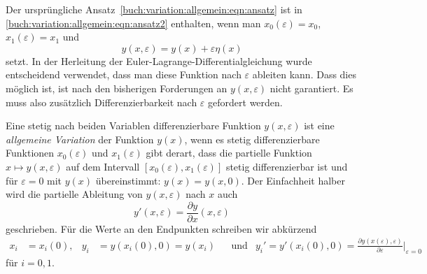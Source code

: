 Der ursprüngliche Ansatz~\eqref{buch:variation:allgemein:eqn:ansatz}
ist in \eqref{buch:variation:allgemein:eqn:ansatz2} enthalten, wenn
man $x_0(\varepsilon)=x_0$, $x_1(\varepsilon)=x_1$ und
\[
y(x,\varepsilon) = y(x) + \varepsilon \eta(x)
\]
setzt.
In der Herleitung der Euler-Lagrange-Differentialgleichung wurde
entscheidend verwendet, dass man diese Funktion nach $\varepsilon$
ableiten kann.
Dass dies möglich ist, ist nach den bisherigen Forderungen an
$y(x,\varepsilon)$ nicht garantiert.
Es muss also zusätzlich Differenzierbarkeit nach $\varepsilon$
gefordert werden.

\begin{definition}
\label{buch:variation:allgemein:def:variation}
Eine stetig nach beiden Variablen differenzierbare Funktion $y(x,\varepsilon)$
ist eine {\em allgemeine Variation} der Funktion $y(x)$, wenn es stetig
differenzierbare Funktionen
$x_0(\varepsilon)$ und $x_1(\varepsilon)$ gibt derart, dass
die partielle Funktion $x\mapsto y(x,\varepsilon)$ auf dem
Intervall $[x_0(\varepsilon),x_1(\varepsilon)]$ stetig differenzierbar
ist und für $\varepsilon=0$ mit $y(x)$ übereinstimmt: $y(x)=y(x,0)$.
Der Einfachheit halber wird die partielle Ableitung von $y(x,\varepsilon)$
nach $x$ auch
\[
y'(x,\varepsilon) = \frac{\partial y}{\partial x}(x,\varepsilon)
\]
geschrieben.
Für die Werte an den Endpunkten schreiben wir abkürzend
\begin{align*}
x_i &= x_i(0),
&
y_i &= y(x_i(0),0) = y(x_i)
&&\text{und}&
y_i'
=
y'(x_i(0),0)
=
\frac{\partial y(x(\varepsilon),\varepsilon)}{\partial\varepsilon}
\bigg|_{\varepsilon=0}
\end{align*}
für $i=0,1$.
\end{definition}

%
%
